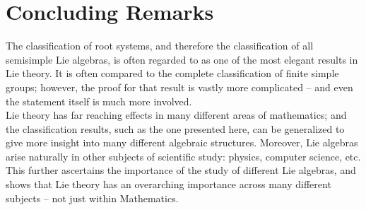 \documentclass{article}
\theoremstyle{definition}
\begin{document}
\section{Concluding Remarks}
\quad The classification of root systems, and therefore the classification of all semisimple Lie algebras, is often regarded to as one of the most elegant results in Lie theory. It is often compared to the complete classification of finite simple groups; however, the proof for that result is vastly more complicated -- and even the statement itself is much more involved. \\

Lie theory has far reaching effects in many different areas of mathematics; and the classification results, such as the one presented here, can be generalized to give more insight into many different algebraic structures. Moreover, Lie algebras arise naturally in other subjects of scientific study: physics, computer science, etc. This further ascertains the importance of the study of different Lie algebras, and shows that Lie theory has an overarching importance across many different subjects -- not just within Mathematics. 
\end{document}
